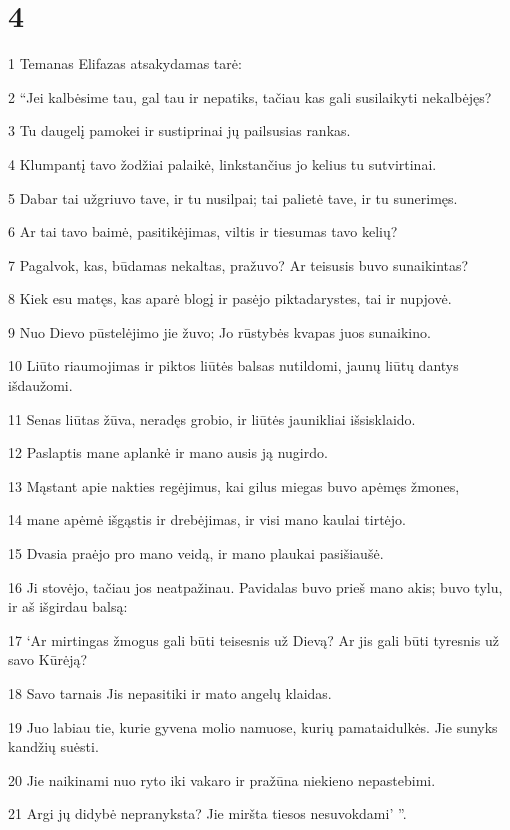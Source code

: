 \chapter{4}


\par 1 Temanas Elifazas atsakydamas tarė: 
\par 2 “Jei kalbėsime tau, gal tau ir nepatiks, tačiau kas gali susilaikyti nekalbėjęs? 
\par 3 Tu daugelį pamokei ir sustiprinai jų pailsusias rankas. 
\par 4 Klumpantį tavo žodžiai palaikė, linkstančius jo kelius tu sutvirtinai. 
\par 5 Dabar tai užgriuvo tave, ir tu nusilpai; tai palietė tave, ir tu sunerimęs. 
\par 6 Ar tai tavo baimė, pasitikėjimas, viltis ir tiesumas tavo kelių? 
\par 7 Pagalvok, kas, būdamas nekaltas, pražuvo? Ar teisusis buvo sunaikintas? 
\par 8 Kiek esu matęs, kas aparė blogį ir pasėjo piktadarystes, tai ir nupjovė. 
\par 9 Nuo Dievo pūstelėjimo jie žuvo; Jo rūstybės kvapas juos sunaikino. 
\par 10 Liūto riaumojimas ir piktos liūtės balsas nutildomi, jaunų liūtų dantys išdaužomi. 
\par 11 Senas liūtas žūva, neradęs grobio, ir liūtės jaunikliai išsisklaido. 
\par 12 Paslaptis mane aplankė ir mano ausis ją nugirdo. 
\par 13 Mąstant apie nakties regėjimus, kai gilus miegas buvo apėmęs žmones, 
\par 14 mane apėmė išgąstis ir drebėjimas, ir visi mano kaulai tirtėjo. 
\par 15 Dvasia praėjo pro mano veidą, ir mano plaukai pasišiaušė. 
\par 16 Ji stovėjo, tačiau jos neatpažinau. Pavidalas buvo prieš mano akis; buvo tylu, ir aš išgirdau balsą: 
\par 17 ‘Ar mirtingas žmogus gali būti teisesnis už Dievą? Ar jis gali būti tyresnis už savo Kūrėją? 
\par 18 Savo tarnais Jis nepasitiki ir mato angelų klaidas. 
\par 19 Juo labiau tie, kurie gyvena molio namuose, kurių pamatai­dulkės. Jie sunyks kandžių suėsti. 
\par 20 Jie naikinami nuo ryto iki vakaro ir pražūna niekieno nepastebimi. 
\par 21 Argi jų didybė nepranyksta? Jie miršta tiesos nesuvokdami’ ”.



